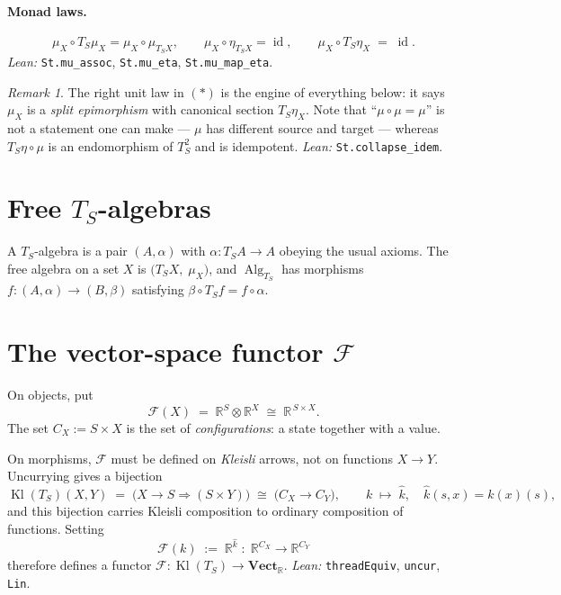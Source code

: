 \documentclass[12pt]{article}
\theoremstyle{plain}
\theoremstyle{remark}
\newtheorem*{remark}{Remark}
\newcommand{\Vect}{\mathbf{Vect}_{\mathbb R}}
\newcommand{\id}{\operatorname{id}}
\newcommand{\RR}{\mathbb R}
\newcommand{\Kl}{\operatorname{Kl}}
\begin{document}
\paragraph{Monad laws.}
\[
\mu_X \circ T_S\mu_X = \mu_X \circ \mu_{T_S X},
\qquad
\mu_X\circ\eta_{T_SX}=\id,
\qquad
\mu_X \circ T_S\eta_X \;=\; \id .
\tag{$*$}
\]
\emph{Lean:} \verb|St.mu_assoc|, \verb|St.mu_eta|, \verb|St.mu_map_eta|.

\begin{remark}
The right unit law in $(*)$ is the engine of everything below: it says $\mu_X$
is a \emph{split epimorphism} with canonical section $T_S\eta_X$. Note that
``$\mu\circ\mu=\mu$'' is not a statement one can make --- $\mu$ has different
source and target --- whereas $T_S\eta\circ\mu$ is an endomorphism of $T_S^2$
and is idempotent. \emph{Lean:} \verb|St.collapse_idem|.
\end{remark}

\bigskip
\section{Free \texorpdfstring{$T_S$}{T\_S}-algebras}
A $T_S$-algebra is a pair $(A,\alpha)$ with $\alpha:T_SA\to A$ obeying the usual
axioms. The free algebra on a set $X$ is $\bigl(T_S X,\;\mu_X\bigr)$, and
$\operatorname{Alg}_{T_S}$ has morphisms $f:(A,\alpha)\to(B,\beta)$ satisfying
$\beta\circ T_S f = f\circ\alpha$.

\bigskip
\section{The vector-space functor \texorpdfstring{$\mathcal F$}{F}}
\label{sec:functor}

On objects, put
\[
\mathcal F(X)\;=\;\RR^{S}\otimes\RR^{X}\;\cong\;\RR^{\,S\times X}.
\]
The set $C_X:=S\times X$ is the set of \emph{configurations}: a state together
with a value.

On morphisms, $\mathcal F$ must be defined on \emph{Kleisli} arrows, not on
functions $X\to Y$. Uncurrying gives a bijection
\[
\Kl(T_S)(X,Y)\;=\;\bigl(X\to S\Rightarrow(S\times Y)\bigr)
\;\cong\;\bigl(C_X\to C_Y\bigr),
\qquad
k\;\longmapsto\;\widehat k,\quad \widehat k(s,x)=k(x)(s),
\]
and this bijection carries Kleisli composition to ordinary composition of
functions. Setting
\[
\boxed{\;\mathcal F(k)\;:=\;\RR^{\widehat k}\;:\;\RR^{C_X}\to\RR^{C_Y}\;}
\]
therefore defines a functor $\mathcal F:\Kl(T_S)\to\Vect$.
\emph{Lean:} \verb|threadEquiv|, \verb|uncur|, \verb|Lin|.
\end{document}
